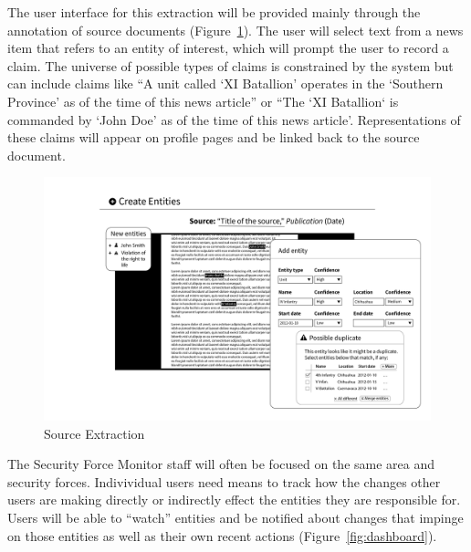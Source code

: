 \documentclass[format=siggraph, review=true]{acmart}
\begin{document}
The user interface for this extraction will be provided mainly through the
annotation of source documents (Figure~\ref{fig:new-entities}). The user
will select text from a news item that refers to an entity of
interest, which will prompt the user to record a claim. The universe
of possible types of claims is constrained by the system but can
include claims like ``A unit called `XI Batallion' operates in the
`Southern Province' as of the time of this news article'' or ``The `XI
Batallion` is commanded by `John Doe' as of the time of this news
article'. Representations of these claims will appear on profile pages
and be linked back to the source document.

\begin{figure}[h]
\includegraphics[width=\columnwidth]{images/sketches/new-entities.png}
\caption{Source Extraction}
\label{fig:new-entities}
\end{figure}

The Security Force Monitor staff will often be focused on the same
area and security forces. Indivividual users need means to track how
the changes other users are making directly or indirectly effect the
entities they are responsible for. Users will be able to ``watch''
entities and be notified about changes that impinge on those entities
as well as their own recent actions (Figure~\ref{fig:dashboard}).
\end{document}
